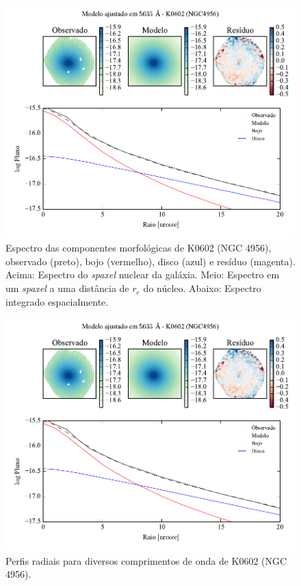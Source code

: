\begin{figure}
	\includegraphics[page=4]{figuras-decomp/K0602_sample006a}
	\caption[Espectro das componentes morfológicas de K0602 (NGC 4956)]
	{Espectro das componentes morfológicas de K0602 (NGC 4956),
	observado (preto), bojo (vermelho), disco (azul) e resíduo (magenta). Acima:
	Espectro do {\em spaxel} nuclear da galáxia. Meio: Espectro em um {\em spaxel}
	a uma distância de $r_e$ do núcleo. Abaixo: Espectro integrado espacialmente.}
	\label{fig:decompSpectra:K0602}
\end{figure}

\begin{figure}
	\includegraphics[page=5]{figuras-decomp/K0602_sample006a}
	\caption[Perfis radiais para diversos comprimentos de onda de K0602 (NGC 4956)]
	{Perfis radiais para diversos comprimentos de onda de K0602 (NGC 4956).}
	\label{fig:decompRadprofSpec:K0602}
\end{figure}

